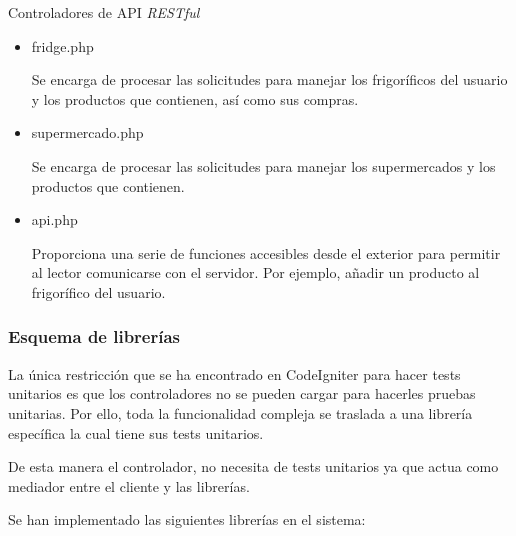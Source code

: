 Controladores de API \emph{RESTful}

    \begin{itemize}
        \item fridge.php

            Se encarga de procesar las solicitudes para manejar los frigoríficos del usuario y los productos que contienen, así como sus compras.

        \item supermercado.php

            Se encarga de procesar las solicitudes para manejar los supermercados y los productos que contienen.

        \item api.php

            Proporciona una serie de funciones accesibles desde el exterior para permitir al lector comunicarse con el servidor. Por ejemplo, añadir un producto al frigorífico del usuario.

    \end{itemize}

    \subsubsection{Esquema de librerías}

La única restricción que se ha encontrado en CodeIgniter para hacer tests unitarios es que los controladores no se pueden cargar para hacerles pruebas unitarias. Por ello, toda la funcionalidad compleja se traslada a una librería específica la cual tiene sus tests unitarios.

De esta manera el controlador, no necesita de tests unitarios ya que actua como mediador entre el cliente y las librerías.

Se han implementado las siguientes librerías en el sistema:

